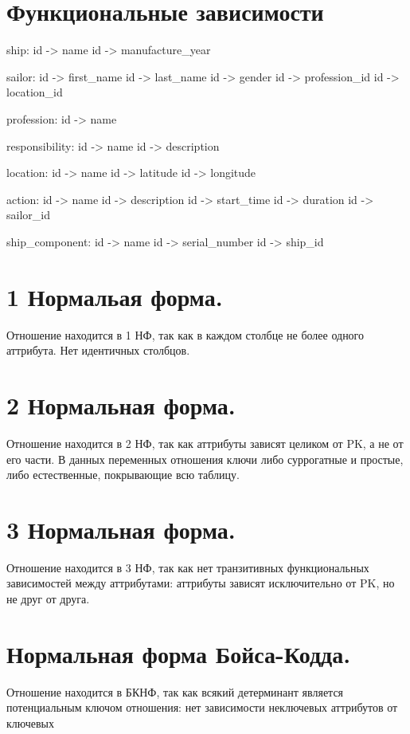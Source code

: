 \documentclass{article}
\begin{document}
\section{Функциональные зависимости}
\begin{code}
    ship:
        id -> name
        id -> manufacture_year

    sailor:
        id -> first_name
        id -> last_name
        id -> gender
        id -> profession_id
        id -> location_id

    profession: 
        id -> name

    responsibility:
        id -> name
        id -> description

    location:
        id -> name
        id -> latitude
        id -> longitude

    action:
        id -> name
        id -> description
        id -> start_time
        id -> duration
        id -> sailor_id
        
    ship_component:
        id -> name
        id -> serial_number
        id -> ship_id
\end{code}

\section{1 Нормальая форма.}
    Отношение находится в 1 НФ, так как в каждом столбце не более одного аттрибута. Нет идентичных столбцов.
    
\section{2 Нормальная форма.}
    Отношение находится в 2 НФ, так как аттрибуты зависят целиком от PK, а не от его части. В данных переменных отношения ключи либо суррогатные и простые, либо естественные, покрывающие всю таблицу.

\section{3 Нормальная форма.}
    Отношение находится в 3 НФ, так как нет транзитивных функциональных зависимостей между аттрибутами: аттрибуты зависят исключительно от PK, но не друг от друга.

\section{Нормальная форма Бойса-Кодда.}
    Отношение находится в БКНФ, так как всякий детерминант является потенциальным ключом отношения: нет зависимости неключевых аттрибутов от ключевых
\end{document}
